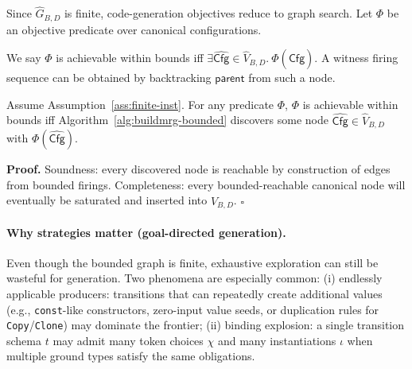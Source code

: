 \documentclass[runningheads]{llncs}
\newcommand{\Cfg}{\mathsf{Cfg}}
\begin{document}
%

Since $\widehat{G}_{B,D}$ is finite, code-generation objectives reduce to graph search. Let $\Phi$ be an objective predicate over canonical configurations.

We say $\Phi$ is achievable within bounds iff $\exists \widehat{\Cfg}\in \widehat{V}_{B,D}.\ \Phi(\widehat{\Cfg})$. A witness firing sequence can be obtained by backtracking $\mathsf{parent}$ from such a node.

\begin{theorem}
\label{thm:bounded-reachability}
Assume Assumption~\ref{ass:finite-inst}. For any predicate $\Phi$,
$\Phi$ is achievable within bounds iff Algorithm~\ref{alg:buildmrg-bounded} discovers some node
$\widehat{\Cfg}\in\widehat{V}_{B,D}$ with $\Phi(\widehat{\Cfg})$.
\end{theorem}
\noindent\textbf{Proof.}
Soundness: every discovered node is reachable by construction of edges from bounded firings. Completeness: every bounded-reachable canonical node will eventually be saturated and inserted into $\widehat{V}_{B,D}$.
\hfill $\square$

\paragraph{Why strategies matter (goal-directed generation).}
Even though the bounded graph is finite, exhaustive exploration can still be wasteful for generation. Two phenomena are especially common:
(i) endlessly applicable producers: transitions that can repeatedly create additional values (e.g., \texttt{const}-like
constructors, zero-input value seeds, or duplication rules for \texttt{Copy}/\texttt{Clone}) may dominate the frontier;
(ii) binding explosion: a single transition schema $t$ may admit many token choices $\chi$ and many instantiations $\iota$
when multiple ground types satisfy the same obligations.
\end{document}
